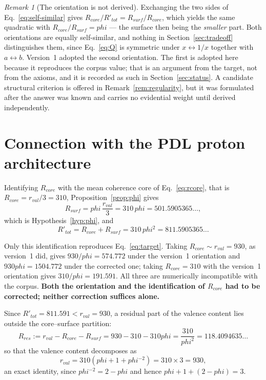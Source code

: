 \documentclass[11pt,a4paper]{article}
\def\varphi{phi}%
\def\mathrm#1{#1}%
\theoremstyle{definition}
\theoremstyle{plain}
\theoremstyle{remark}
\newtheorem{remark}{Remark}
\newcommand{\Rcore}{R_{\mathrm{core}}}
\newcommand{\Rsurf}{R_{\mathrm{surf}}}
\newcommand{\Rres}{R_{\mathrm{res}}}
\newcommand{\rval}{r_{\mathrm{val}}}
\begin{document}
\begin{remark}[The orientation is not derived]
\label{rem:orientation}
Exchanging the two sides of Eq.~\eqref{eq:self-similar} gives $\Rcore/R'_{\mathrm{tot}} = \Rsurf/\Rcore$, which yields the same quadratic with $\Rcore/\Rsurf = \varphi$ --- the surface then being the \emph{smaller} part. Both orientations are equally self-similar, and nothing in Section~\ref{sec:tradeoff} distinguishes them, since Eq.~\eqref{eq:Q} is symmetric under $x \leftrightarrow 1/x$ together with $a \leftrightarrow b$. Version~1 adopted the second orientation. The first is adopted here because it reproduces the corpus value; that is an argument from the target, not from the axioms, and it is recorded as such in Section~\ref{sec:status}. A candidate structural criterion is offered in Remark~\ref{rem:regularity}, but it was formulated after the answer was known and carries no evidential weight until derived independently.
\end{remark}

\section{Connection with the PDL proton architecture}
\label{sec:connection}

Identifying $\Rcore$ with the mean coherence core of Eq.~\eqref{eq:rcore}, that is $\Rcore = \rval/3 = 310$, Proposition~\ref{prop:phi} gives
\begin{equation}
\Rsurf = \varphi\,\frac{\rval}{3} = 310\,\varphi = 501.5905365\ldots,
\label{eq:target}
\end{equation}
which is Hypothesis~\ref{hyp:phi}, and
\[
R'_{\mathrm{tot}} = \Rcore + \Rsurf = 310\,\varphi^{2} = 811.5905365\ldots
\]

Only this identification reproduces Eq.~\eqref{eq:target}. Taking $\Rcore \sim \rval = 930$, as version~1 did, gives $930/\varphi = 574.772$ under the version~1 orientation and $930\varphi = 1504.772$ under the corrected one; taking $\Rcore = 310$ with the version~1 orientation gives $310/\varphi = 191.591$. All three are numerically incompatible with the corpus. \textbf{Both the orientation and the identification of $\Rcore$ had to be corrected; neither correction suffices alone.}

Since $R'_{\mathrm{tot}} = 811.591 < \rval = 930$, a residual part of the valence content lies outside the core--surface partition:
\begin{equation}
\Rres := \rval - \Rcore - \Rsurf = 930 - 310 - 310\varphi = \frac{310}{\varphi^{2}} = 118.4094635\ldots
\label{eq:residual}
\end{equation}
so that the valence content decomposes as
\begin{equation}
\rval = 310\left(\varphi + 1 + \varphi^{-2}\right) = 310 \times 3 = 930 ,
\label{eq:threeway}
\end{equation}
an exact identity, since $\varphi^{-2} = 2 - \varphi$ and hence $\varphi + 1 + (2-\varphi) = 3$.
\end{document}
